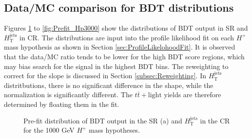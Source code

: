 \subsection{Data/MC comparison for BDT distributions}
\label{subsec:Data/MCFinalDiscBeforeReweight}
Figures \ref{fig:Prefit_Hp1000} to \ref{fig:Prefit_Hp3000} show the distributions of BDT output in SR and $H_{\text{T}}^{\text{jets}}$ in CR. The distributions are input into the profile likelihood fit on each $H^{+}$ mass hypothesis as shown in Section \ref{sec:ProfileLikelohoodFit}. It is observed that the data/MC ratio tends to be lower for the high BDT score regions, which may bias search for the signal in the highest BDT bins. The reweighting to correct for the slope is discussed in Section \ref{subsec:Reweighting}. In $H_{\text{T}}^{\text{jets}}$ distritbutions, there is no significant difference in the shape, while the normalization is significantly different. The $t\bar{t}+\text{light}$ yields are therefore determined by floating them in the fit.

\begin{figure}[H]
  \caption{Pre-fit distribution of BDT output in the SR (a) and $H_{\text{T}}^{\text{jets}}$ in the CR for the 1000 GeV $H^{+}$ mass hypotheses.}
  \label{fig:Prefit_Hp1000}
\end{figure}

